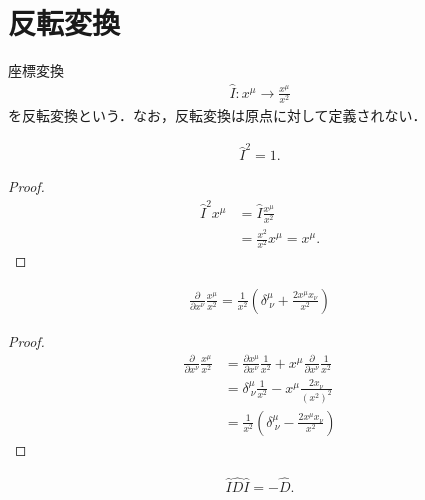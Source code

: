 \section{反転変換}
\begin{defn}[反転変換]
	座標変換
	\begin{align}
		\hat{I}:x^{\mu}\longrightarrow{}\frac{x^{\mu}}{x^{2}}
	\end{align}
	を反転変換という．なお，反転変換は原点に対して定義されない．
\end{defn}
\begin{prop}
	\begin{align}
		\hat{I}^{2}=1.
	\end{align}
\end{prop}
\begin{proof}
	\begin{align}
		\hat{I}^{2}x^{\mu} & =\hat{I}\frac{x^{\mu}}{x^{2}}        \\
		                   & =\frac{x^{2}}{x^{2}}x^{\mu}=x^{\mu}.
	\end{align}
\end{proof}
\begin{lem}
	\begin{align}
		\frac{\partial}{\partial{}x^{\nu}}\frac{x^{\mu}}{x^{2}}=\frac{1}{x^{2}}\left(\delta^{\mu}_{\ \nu}+\frac{2x^{\mu}x_{\nu}}{x^{2}}\right)
	\end{align}
\end{lem}
\begin{proof}
	\begin{align}
		\frac{\partial}{\partial{}x^{\nu}}\frac{x^{\mu}}{x^{2}} & =\frac{\partial{}x^{\mu}}{\partial{}x^{\nu}}\frac{1}{x^{2}}+x^{\mu}\frac{\partial}{\partial{}x^{\nu}}\frac{1}{x^{2}} \\
		                                                        & =\delta^{\mu}_{\ \nu}\frac{1}{x^{2}}-x^{\mu}\frac{2x_{\nu}}{(x^{2})^{2}}                                             \\
		                                                        & =\frac{1}{x^{2}}\left(\delta^{\mu}_{\ \nu}-\frac{2x^{\mu}x_{\nu}}{x^{2}}\right)
	\end{align}
\end{proof}
\begin{prop}
	\begin{align}
		\hat{I}\hat{D}\hat{I}=-\hat{D}.
	\end{align}
\end{prop}
